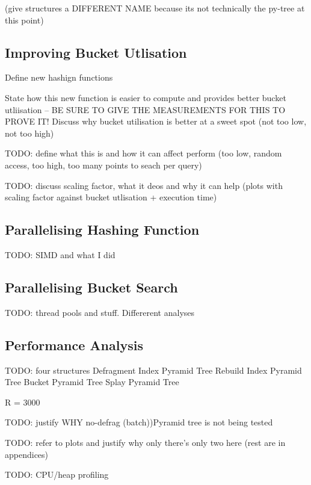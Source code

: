  (give structures a DIFFERENT NAME because its not technically the py-tree at this point)

\subsection{Improving Bucket Utlisation}

Define new hashign functions

 State how this new function is easier to compute and provides better bucket utliisation -- BE SURE TO GIVE THE MEASUREMENTS FOR THIS TO PROVE IT! Discuss why bucket utilisation is better at a sweet spot (not too low, not too high)

TODO: define what this is and how it can affect perform (too low, random access, too high, too many points to seach per query)

TODO: discuss scaling factor, what it deos and why it can help (plots with scaling factor against bucket utlisation + execution time)

\subsection{Parallelising Hashing Function}

TODO: SIMD and what I did

\subsection{Parallelising Bucket Search}

TODO: thread pools and stuff. Differerent analyses

\subsection{Performance Analysis}

TODO: four structures
	Defragment Index Pyramid Tree
	Rebuild Index Pyramid Tree
	Bucket Pyramid Tree
	Splay Pyramid Tree

	R = 3000

TODO: justify WHY no-defrag (batch))Pyramid tree is not being tested

TODO: refer to plots and justify why only there's only two here (rest are in appendices)

TODO: CPU/heap profiling

